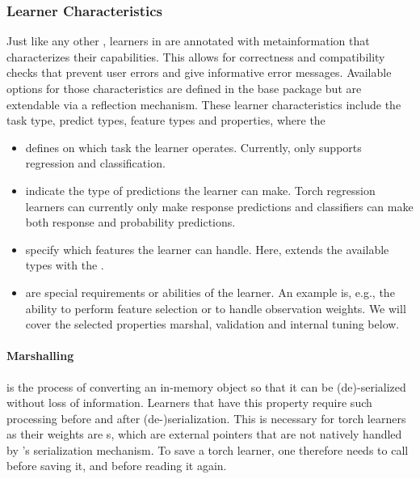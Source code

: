 \documentclass[article]{jss}
\theoremstyle{definition}
\begin{document}
\subsubsection{Learner Characteristics}\label{sec:learner-characteristics}

Just like any other , learners in  are annotated with metainformation that characterizes their capabilities.
This allows for correctness and compatibility checks that prevent user errors and give informative error messages.
Available options for those characteristics are defined in the  base package but are extendable via a reflection mechanism.
These learner characteristics include the task type, predict types, feature types and properties, where the

\begin{itemize}
    \item {} defines on which task the learner operates. Currently,  only supports regression and classification.
    \item {} indicate the type of predictions the learner can make. Torch regression learners can currently only make response predictions and classifiers can make both response and probability predictions.
    \item {} specify which features the learner can handle. Here, \mlrttorch{} extends the available types with the .
    \item {} are special requirements or abilities of the learner. An example is, e.g., the ability to perform feature selection or to handle observation weights. We will cover the selected properties marshal, validation and internal tuning below.
\end{itemize}


\paragraph{Marshalling} is the process of converting an in-memory object so that it can be (de)-serialized without loss of information.
Learners that have this property require such processing before and after (de-)serialization.
This is necessary for torch learners as their weights are s, which are external pointers that are not natively handled by \rlang{}'s serialization mechanism.
To save a torch learner, one therefore needs to call  before saving it, and  before reading it again.
\end{document}
